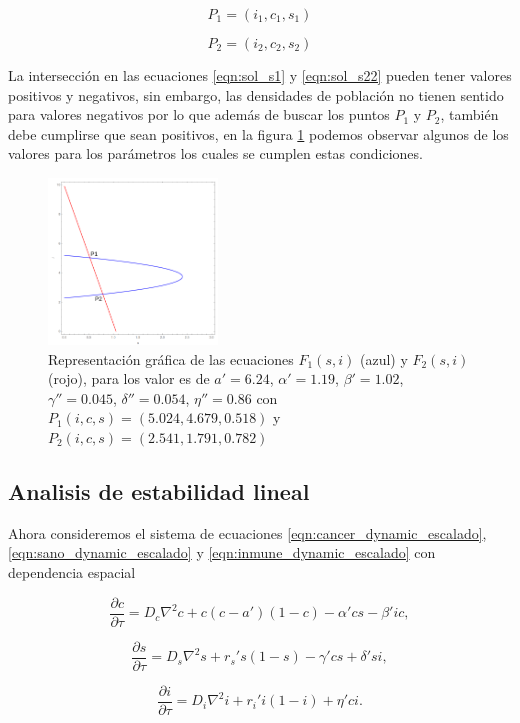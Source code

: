 \documentclass{article}
\begin{document}
\begin{equation}
   P_1 = (i_1, c_1, s_1)    
\end{equation}

\begin{equation}
    P_2 = (i_2, c_2, s_2)
\end{equation}

La intersección en las ecuaciones \ref{eqn:sol_s1} y \ref{eqn:sol_s22} pueden tener valores positivos y negativos, sin embargo, las densidades de población no tienen sentido para valores negativos por lo que además de buscar los puntos $P_1$ y $P_2$, también debe cumplirse que sean positivos, en la figura \ref{fig:nullclines} podemos observar algunos de los valores para los parámetros los cuales se cumplen estas condiciones.

\begin{figure}[ht]
    \centering
    \includegraphics[width=0.4\textwidth]{images/nullclines.png}
    \caption{Representación gráfica de las ecuaciones $F_1(s,i)$ (azul) y $F_2(s,i)$ (rojo), para los valor es de $a'=6.24$, $\alpha'=1.19$, $\beta'=1.02$, $\gamma''=0.045$, $\delta''=0.054$, $\eta''=0.86$ con $P_1(i,c,s)=(5.024, 4.679, 0.518)$ y $P_2(i,c,s)=(2.541,1.791, 0.782)$}
    \label{fig:nullclines}
\end{figure}


\newpage
\subsection{Analisis de estabilidad lineal}

Ahora consideremos el sistema de ecuaciones \ref{eqn:cancer_dynamic_escalado}, \ref{eqn:sano_dynamic_escalado} y \ref{eqn:inmune_dynamic_escalado} con dependencia espacial

\begin{equation}
    \frac{\partial c}{\partial \tau} = D_c \nabla ^2 c +  c (c - a')(1-c) - \alpha' cs - \beta' i c,
    \label{eqn:cancer_dynamict_escalado}
\end{equation}

\begin{equation}
    \frac{\partial s}{\partial \tau} = D_s \nabla ^2 s + r_s ' s (1 - s)  - \gamma' cs + \delta' si,
    \label{eqn:sano_dynamict_escalado}
\end{equation}


\begin{equation}
    \frac{\partial i}{\partial \tau} = D_i \nabla ^2 i + r_i ' i(1-i) + \eta' ci.
    \label{eqn:inmune_dynamict_escalado}
\end{equation}
 
\newpage


\end{document}
